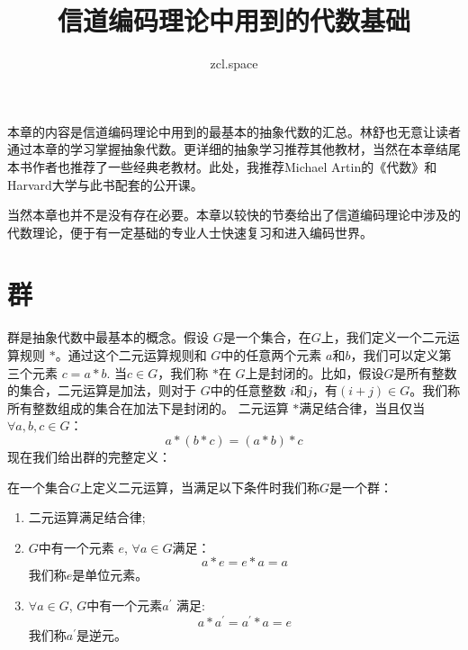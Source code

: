 \documentclass[10pt,a4paper,UTF8]{article}
\author{zcl.space}
\date{}
\title{信道编码理论中用到的代数基础}
\begin{document}
\maketitle
\tableofcontents
{}
本章的内容是信道编码理论中用到的最基本的抽象代数的汇总。林舒也无意让读者通过本章的学习掌握抽象代数。更详细的抽象学习推荐其他教材，当然在本章结尾本书作者也推荐了一些经典老教材。此处，我推荐Michael Artin的《代数》和Harvard大学与此书配套的公开课。

当然本章也并不是没有存在必要。本章以较快的节奏给出了信道编码理论中涉及的代数理论，便于有一定基础的专业人士快速复习和进入编码世界。

\section{群}
\label{sec:org72e8b21}


群是抽象代数中最基本的概念。假设 \(G\)是一个集合，在\(G\)上，我们定义一个二元运算规则 \(*\)。通过这个二元运算规则和 \(G\)中的任意两个元素 \(a\)和\(b\)，我们可以定义第三个元素 \(c=a*b\). 当\(c\in G\)，我们称 \(*\)在 \(G\)上是封闭的。比如，假设\(G\)是所有整数的集合，二元运算是加法，则对于 \(G\)中的任意整数 \(i\)和\(j\)，有\((i+j)\in G\)。我们称所有整数组成的集合在加法下是封闭的。 二元运算 \(*\)满足结合律，当且仅当 \(\forall a,b,c\in G\)：\[a*(b*c) = (a*b)*c\] 现在我们给出群的完整定义：

在一个集合\(G\)上定义二元运算，当满足以下条件时我们称\(G\)是一个群：
\begin{enumerate}
\item 二元运算满足结合律;
\item \(G\)中有一个元素 \(e\), \(\forall a\in G\)满足： \[a*e = e*a = a\]我们称\(e\)是单位元素。
\item \(\forall a\in G\), \(G\)中有一个元素\(a^{'}\) 满足: \[a*a^{'} = a^{'}*a = e\] 我们称\(a^{'}\)是逆元。
\end{enumerate}
\end{document}
